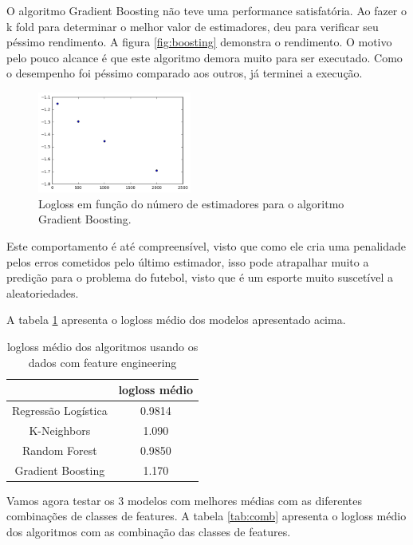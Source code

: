 \documentclass{article}
\begin{document}
O algoritmo Gradient Boosting não teve uma performance satisfatória. Ao fazer o k fold para determinar o melhor valor de estimadores, deu para verificar seu péssimo rendimento. A figura \ref{fig:boosting} demonstra o rendimento. O motivo pelo pouco alcance é que este algoritmo demora muito para ser executado. Como o desempenho foi péssimo comparado aos outros, já terminei a execução.

\begin{figure}[!h]
	\centering
	\includegraphics[width=0.45\textwidth]{./04-figuras/gradient_k.png}
	\caption{Logloss em função do número de estimadores para o algoritmo Gradient Boosting.}
	\label{fig:knn}
\end{figure}

Este comportamento é até compreensível, visto que como ele cria uma penalidade pelos erros cometidos pelo último estimador, isso pode atrapalhar muito a predição para o problema do futebol, visto que é um esporte muito suscetível a aleatoriedades.


A tabela \ref{tab:logloss1} apresenta o logloss médio dos modelos apresentado acima.

\begin{table}[!h]
	\centering
	\caption{logloss médio dos algoritmos usando os dados com feature engineering}
	\label{tab:logloss1}
	\begin{tabular}{c|c}
		& logloss médio \\ \hline
		Regressão Logística & 0.9814        \\ \hline
		K-Neighbors         & 1.090         \\ \hline
		Random Forest       & 0.9850        \\ \hline
		Gradient Boosting   & 1.170        
	\end{tabular}
\end{table}


Vamos agora testar os 3 modelos com melhores médias com as diferentes combinações de classes de features. A tabela \ref{tab:comb} apresenta o logloss médio dos algoritmos com as combinação das classes de features.
\end{document}
